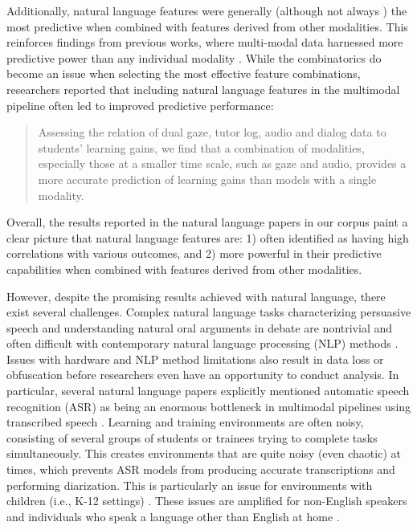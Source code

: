 \documentclass[manuscript,screen,review]{acmart}
\begin{document}
\noindent Additionally, natural language features were generally (although not always \cite{1770989706}) the most predictive when combined with features derived from other modalities. This reinforces findings from previous works, where multi-modal data harnessed more predictive power than any individual modality \cite{sharma_multimodal_2020}. While the combinatorics do become an issue when selecting the most effective feature combinations, researchers reported that including natural language features in the multimodal pipeline often led to improved predictive performance:

\begin{quote}
    Assessing the relation of dual gaze, tutor log, audio and dialog data to students' learning gains, we find that a combination of modalities, especially those at a smaller time scale, such as gaze and audio, provides a more accurate prediction of learning gains than models with a single modality. \cite{3051560548}
\end{quote}

\noindent Overall, the results reported in the natural language papers in our corpus paint a clear picture that natural language features are: 1) often identified as having high correlations with various outcomes, and 2) more powerful in their predictive capabilities when combined with features derived from other modalities. 

However, despite the promising results achieved with natural language, there exist several challenges. Complex natural language tasks characterizing persuasive speech and understanding natural oral arguments in debate are nontrivial and often difficult with contemporary natural language processing (NLP) methods \cite{85990093}. Issues with hardware and NLP method limitations also result in data loss or obfuscation before researchers even have an opportunity to conduct analysis. In particular, several natural language papers explicitly mentioned automatic speech recognition (ASR) as being an enormous bottleneck in multimodal pipelines using transcribed speech \cite{1118315889,666050348,32184286}. Learning and training environments are often noisy, consisting of several groups of students or trainees trying to complete tasks simultaneously. This creates environments that are quite noisy (even chaotic) at times, which prevents ASR models from producing accurate transcriptions and performing diarization. This is particularly an issue for environments with children (i.e., K-12 settings) \cite{32184286}. These issues are amplified for non-English speakers and individuals who speak a language other than English at home \cite{666050348}.
\end{document}
